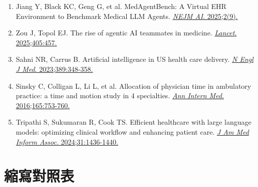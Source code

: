 \documentclass[12pt,a4paper]{article}
\begin{document}
\begin{enumerate}
    \item Jiang Y, Black KC, Geng G, et al. MedAgentBench: A Virtual EHR Environment to Benchmark Medical LLM Agents. \href{https://doi.org/10.1056/AIdbp2500144}{\textit{NEJM AI}. 2025;2(9).}

    \item Zou J, Topol EJ. The rise of agentic AI teammates in medicine. \href{https://doi.org/10.1016/S0140-6736(25)00202-8}{\textit{Lancet}. 2025;405:457.}

    \item Sahni NR, Carrus B. Artificial intelligence in US health care delivery. \href{https://doi.org/10.1056/NEJMra2204673}{\textit{N Engl J Med}. 2023;389:348-358.}

    \item Sinsky C, Colligan L, Li L, et al. Allocation of physician time in ambulatory practice: a time and motion study in 4 specialties. \href{https://doi.org/10.7326/M16-0961}{\textit{Ann Intern Med}. 2016;165:753-760.}

    \item Tripathi S, Sukumaran R, Cook TS. Efficient healthcare with large language models: optimizing clinical workflow and enhancing patient care. \href{https://doi.org/10.1093/jamia/ocad258}{\textit{J Am Med Inform Assoc}. 2024;31:1436-1440.}
\end{enumerate}

\section{縮寫對照表}
\end{document}
